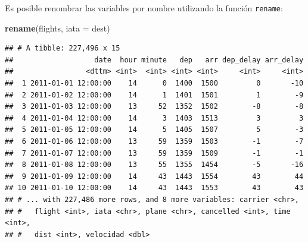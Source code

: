 \documentclass[]{article}
\newenvironment{Shaded}{\begin{snugshade}}{\end{snugshade}}
\newcommand{\KeywordTok}[1]{\textcolor[rgb]{0.13,0.29,0.53}{\textbf{#1}}}
\newcommand{\DataTypeTok}[1]{\textcolor[rgb]{0.13,0.29,0.53}{#1}}
\newcommand{\NormalTok}[1]{#1}
\begin{document}
Es posible renombrar las variables por nombre utilizando la función
\texttt{rename}:

\begin{Shaded}
\begin{Highlighting}[]
\KeywordTok{rename}\NormalTok{(flights, }\DataTypeTok{iata =}\NormalTok{ dest)}
\end{Highlighting}
\end{Shaded}

\begin{verbatim}
## # A tibble: 227,496 x 15
##                   date  hour minute   dep   arr dep_delay arr_delay
##                 <dttm> <int>  <int> <int> <int>     <int>     <int>
##  1 2011-01-01 12:00:00    14      0  1400  1500         0       -10
##  2 2011-01-02 12:00:00    14      1  1401  1501         1        -9
##  3 2011-01-03 12:00:00    13     52  1352  1502        -8        -8
##  4 2011-01-04 12:00:00    14      3  1403  1513         3         3
##  5 2011-01-05 12:00:00    14      5  1405  1507         5        -3
##  6 2011-01-06 12:00:00    13     59  1359  1503        -1        -7
##  7 2011-01-07 12:00:00    13     59  1359  1509        -1        -1
##  8 2011-01-08 12:00:00    13     55  1355  1454        -5       -16
##  9 2011-01-09 12:00:00    14     43  1443  1554        43        44
## 10 2011-01-10 12:00:00    14     43  1443  1553        43        43
## # ... with 227,486 more rows, and 8 more variables: carrier <chr>,
## #   flight <int>, iata <chr>, plane <chr>, cancelled <int>, time <int>,
## #   dist <int>, velocidad <dbl>
\end{verbatim}
\end{document}

